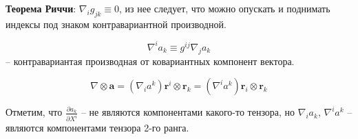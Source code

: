 \begin{enumerate}
\begin{itemize}
		\textbf{Теорема Риччи}: $\nabla_i g_{jk} \equiv 0$, из нее следует, что можно опускать и 
		поднимать индексы под знаком контравариантной производной.
		
		\[
		\nabla^i a_k \equiv g^{ij} \nabla_j a_k
		\]
		-- контравариантая производная от ковариантных компонент вектора.
		
		\[
		\nabla \otimes \mathbf{a}
		= (\nabla_i a^k) \mathbf{r}^i \otimes \mathbf{r}_k
		= (\nabla^i a^k) \mathbf{r}_i \otimes \mathbf{r}_k
		\]
		
		Отметим, что $ \frac{\partial a_k}{\partial X^i} $ -- не являются компонентами какого-то
		тензора, но $\nabla_i a_k$, $\nabla^i a^k$ -- являются компонентами тензора 2-го ранга.
		
	\end{itemize}
\end{enumerate}

